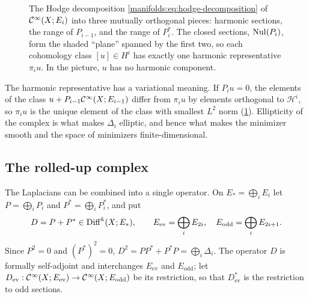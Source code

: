 \begin{figure}[ht]
\centering
{}
\caption{The Hodge decomposition \eqref{manifolds:eq:hodge-decomposition} of
$\mathcal{C}^\infty(X;E_i)$ into three mutually orthogonal pieces: harmonic sections, the
range of $P_{i-1}$, and the range of $P_i^*$. The closed sections,
$\operatorname{Nul}(P_i)$, form the shaded ``plane'' spanned by the first two, so each
cohomology class $[u]\in H^i$ has exactly one harmonic representative
$\pi_iu$. In the picture, $u$ has no harmonic component.}
\label{manifolds:fig:hodge}
\end{figure}

\begin{discussion}
The harmonic representative has a variational meaning. If $P_iu=0$, the
elements of the class $u+P_{i-1}\mathcal{C}^\infty(X;E_{i-1})$ differ from $\pi_iu$ by
elements orthogonal to $\mathcal H^i$, so $\pi_iu$ is the unique element of the
class with smallest $L^2$ norm (\cref{manifolds:fig:hodge}). Ellipticity of the
complex is what makes $\Delta_i$ elliptic, and hence what makes the minimizer
smooth and the space of minimizers finite-dimensional.
\end{discussion}

\subsection{The rolled-up complex}
The Laplacians can be combined into a single operator. On
$E_*=\bigoplus_iE_i$ let $P=\bigoplus_iP_i$ and $P^*=\bigoplus_iP_i^*$, and put
\begin{equation*}
D=P+P^*\in\operatorname{Diff}^{k}(X;E_*),\qquad
E_{\mathrm{ev}}=\bigoplus_iE_{2i},\quad E_{\mathrm{odd}}=\bigoplus_iE_{2i+1}.
\end{equation*}
Since $P^2=0$ and $(P^*)^2=0$, $D^2=PP^*+P^*P=\bigoplus_i\Delta_i$. The operator $D$ is
formally self-adjoint and interchanges $E_{\mathrm{ev}}$ and $E_{\mathrm{odd}}$; let
$D_{\mathrm{ev}}:\mathcal{C}^\infty(X;E_{\mathrm{ev}})\to\mathcal{C}^\infty(X;E_{\mathrm{odd}})$ be its restriction, so that
$D_{\mathrm{ev}}^*$ is the restriction to odd sections.

